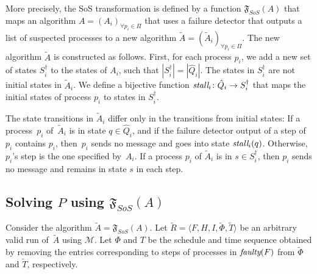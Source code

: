 \documentclass[11pt]{article}
\newcommand{\ident}[1]{\textit{#1}\rule{0cm}{1ex}}
\newcommand{\MFD}{\ensuremath{\mathcal{M}}}
\newcommand{\problem}{P} \newcommand{\Alg}{A}
\newcommand{\TrAlg}{\widetilde{A}}
\begin{document}
More precisely, the SoS transformation is defined by a function
     $\mathfrak{F}_{SoS}(\Alg)$ that maps an algorithm $\Alg =
     (\Alg_i)_{\forall p_i \in \Pi}$ that uses a failure detector that
     outputs a list of suspected processes to a new algorithm $\TrAlg
     = (\TrAlg_i)_{\forall p_i \in \Pi}$.
The new algorithm $\TrAlg$ is constructed as follows.
First, for each process $p_i$, we add a new set of states
     $S^\dagger_i$ to the states of $\Alg_i$, such that $|S^\dagger_i|
     = |\hat{Q}_i|$.
The states in $S^\dagger_i$ are not initial states in $\TrAlg_i$.
We define a bijective function $\ident{stall}_i\colon \hat{Q}_i
     \rightarrow S^\dagger_i$ that maps the initial states of process
     $p_i$ to states in $S^\dagger_i$.


The state transitions in $\TrAlg_i$ differ only in the transitions
from initial states:
If a process~$p_i$ of~$\TrAlg_i$ is in state $q\in\hat{Q}_i$, and if
     the failure detector output of a step of $p_i$ contains $p_i$,
     then~$p_i$ sends no message and goes into state
     $\ident{stall}_i(q)$.
Otherwise, $p_i$'s step is the one specified by~$\Alg_i$.
If a process $p_i$ of $\TrAlg_i$ is in $s\in S^\dagger_i$, then $p_i$
     sends no message and remains in state $s$ in each step.




\subsection{Solving $\problem$ using $\mathfrak{F}_{SoS}(\Alg)$}

Consider the algorithm $\TrAlg = \mathfrak{F}_{SoS}(\Alg)$.
Let $\widetilde{R}=\langle F, H, I, \widetilde{\Phi}, \widetilde{T}
     \rangle$ be an arbitrary valid run of~$\TrAlg$ using $\MFD$.
Let $\Phi$ and $T$ be the schedule and time sequence obtained by
     removing the entries corresponding to steps of processes in
     $\ident{faulty}(F)$ from $\widetilde{\Phi}$ and $\widetilde{T}$,
     respectively.
\end{document}
